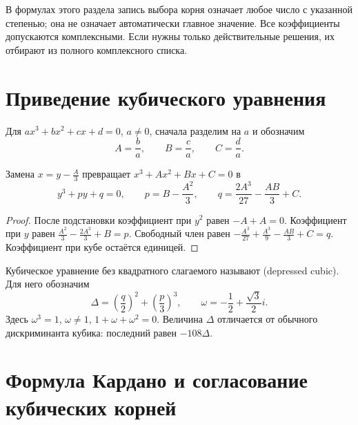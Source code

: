 В формулах этого раздела запись выбора корня означает любое число с указанной степенью; она не означает автоматически главное значение. Все коэффициенты допускаются комплексными. Если нужны только действительные решения, их отбирают из полного комплексного списка.

\section{Приведение кубического уравнения}

Для \(ax^3+bx^2+cx+d=0\), \(a\ne0\), сначала разделим на \(a\) и обозначим
\[
A=\frac ba,\qquad B=\frac ca,\qquad C=\frac da.
\]
\begin{theorem}\label{thm:legacy-c23-10}
Замена \(x=y-\frac A3\) превращает \(x^3+Ax^2+Bx+C=0\) в
\[
y^3+py+q=0,\qquad
p=B-\frac{A^2}{3},\qquad q=\frac{2A^3}{27}-\frac{AB}{3}+C.
\]
\end{theorem}
\begin{proof}
После подстановки коэффициент при \(y^2\) равен \(-A+A=0\). Коэффициент при \(y\) равен \(\frac{A^2}{3}-\frac{2A^2}{3}+B=p\). Свободный член равен \(-\frac{A^3}{27}+\frac{A^3}{9}-\frac{AB}{3}+C=q\). Коэффициент при кубе остаётся единицей.
\end{proof}

\begin{definition}
Кубическое уравнение без квадратного слагаемого называют  (depressed cubic). Для него обозначим
\[
\Delta=\left(\frac q2\right)^2+\left(\frac p3\right)^3,
\qquad \omega=-\frac12+\frac{\sqrt3}{2}i.
\]
Здесь \(\omega^3=1\), \(\omega\ne1\), \(1+\omega+\omega^2=0\). Величина \(\Delta\) отличается от обычного дискриминанта кубика: последний равен \(-108\Delta\).
\end{definition}

\section{Формула Кардано и согласование кубических корней}

